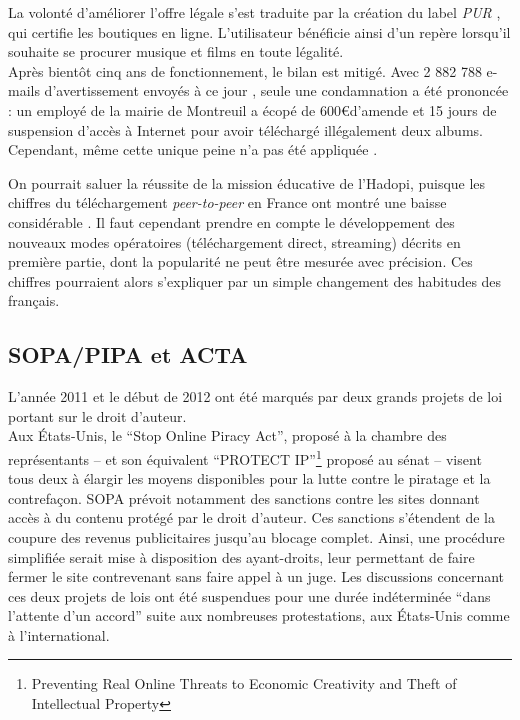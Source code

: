 \documentclass[a4paper]{report}
\begin{document}
		La volonté d'améliorer l'offre légale s'est traduite par la création du label \emph{PUR} \cite{label-pur}, qui certifie les boutiques en ligne. L'utilisateur bénéficie ainsi d'un repère lorsqu'il souhaite se procurer musique et films en toute légalité.\\

		\label{hadopi-echec}
		Après bientôt cinq ans de fonctionnement, le bilan est mitigé. Avec 2 882 788 e-mails d'avertissement envoyés à ce jour \cite{hadopi-chiffres}, seule une condamnation a été prononcée : un employé de la mairie de Montreuil a écopé de 600\euro d'amende et 15 jours de suspension d'accès à Internet pour avoir téléchargé illégalement deux albums. Cependant, même cette unique peine n'a pas été appliquée \cite{hadopi-condamnation}.

		On pourrait saluer la réussite de la mission éducative de l'Hadopi, puisque les chiffres du téléchargement \emph{peer-to-peer} en France ont montré une baisse considérable \cite{hadopi-recul-p2p}. Il faut cependant prendre en compte le développement des nouveaux modes opératoires (téléchargement direct, streaming) décrits en première partie, dont la popularité ne peut être mesurée avec précision. Ces chiffres pourraient alors s'expliquer par un simple changement des habitudes des français.

		\subsection{SOPA/PIPA et ACTA}
		L'année 2011 et le début de 2012 ont été marqués par deux grands projets de loi portant sur le droit d'auteur.\\

		Aux États-Unis, le ``Stop Online Piracy Act'', proposé à la chambre des représentants – et son équivalent ``PROTECT IP''\footnote{Preventing Real Online Threats to Economic Creativity and Theft of Intellectual Property} proposé au sénat – visent tous deux à élargir les moyens disponibles pour la lutte contre le piratage et la contrefaçon. SOPA prévoit notamment des sanctions contre les sites donnant accès à du contenu protégé par le droit d'auteur. Ces sanctions s'étendent de la coupure des revenus publicitaires jusqu'au blocage complet. Ainsi, une procédure simplifiée serait mise à disposition des ayant-droits, leur permettant de faire fermer le site contrevenant sans faire appel à un juge. Les discussions concernant ces deux projets de lois ont été suspendues pour une durée indéterminée ``dans l'attente d'un accord'' \cite{suspension-sopa} suite aux nombreuses protestations, aux États-Unis comme à l'international.\\
\end{document}
